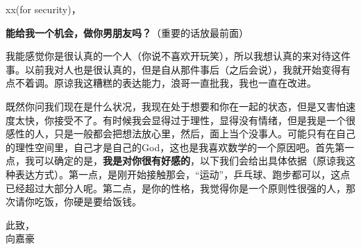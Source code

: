\documentclass[a4paper,12pt]{letter}
\begin{document}
\begin{letter}{}

\opening{xx(for security)，}

\textbf{能给我一个机会，做你男朋友吗？}（重要的话放最前面）

我能感觉你是很认真的一个人（你说不喜欢开玩笑），所以我想认真的来对待这件事。以前我对人也是很认真的，但是自从那件事后（之后会说），我就开始变得有点不着调。原谅我这糟糕的表达能力，浪哥一直批我，我也一直在改进。

既然你问我们现在是什么状况，我现在处于想要和你在一起的状态，但是又害怕速度太快，你接受不了。有时候我会显得过于理性，显得没有情绪，但是我是一个很感性的人，只是一般都会把想法放心里，然后，面上当个没事人。可能只有在自己的理性空间里，自己才是自己的God，这也是我喜欢数学的一个原因吧。首先第一点，我可以确定的是，\textbf{我是对你很有好感的}，以下我们会给出具体依据（原谅我这种表达方式）。第一点，是刚开始接触那会，“运动”，乒乓球、跑步都可以，这点已经超过大部分人呢。第二点，是你的性格，我觉得你是一个原则性很强的人，那次请你吃饭，你硬是要给饭钱。



\closing{此致，\\ 向嘉豪}

\end{letter}
\end{document}
